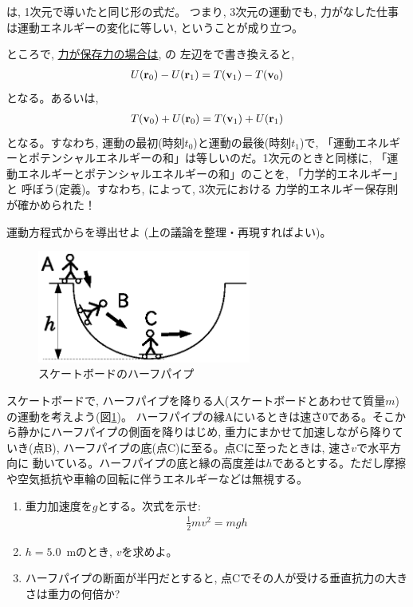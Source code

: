 は, 1次元で導いたと同じ形の式だ。
つまり, 3次元の運動でも, 力がなした仕事は運動エネルギーの変化に等しい, 
ということが成り立つ。

ところで, \underline{力が保存力の場合は}, の
左辺をで書き換えると, 
\begin{eqnarray}
U({\bf r}_0)-U({\bf r}_1)=T({\bf v}_1)-T({\bf v}_0)\label{3D_work_conservative0}
\end{eqnarray}
となる。あるいは, 
\begin{eqnarray}
T({\bf v}_0)+U({\bf r}_0)=T({\bf v}_1)+U({\bf r}_1)\label{3D_work_conservative1}
\end{eqnarray}
となる。すなわち, 運動の最初(時刻$t_0$)と運動の最後(時刻$t_1$)で, 
「運動エネルギーとポテンシャルエネルギーの和」は等しいのだ。1次元のときと同様に, 
「運動エネルギーとポテンシャルエネルギーの和」のことを, 「力学的エネルギー」と
呼ぼう(定義)。すなわち, によって, 3次元における
力学的エネルギー保存則が確かめられた！\\

\begin{q}\label{q:consmom3D} 運動方程式からを導出せよ
(上の議論を整理・再現すればよい)。\end{q}


\begin{figure}[h]
    \centering
    \includegraphics[width=7cm]{half_pipe.eps}
    \caption{スケートボードのハーフパイプ}\label{fig:half_pipe}
\end{figure}
\begin{q}\label{q:half_pipe}
スケートボードで, ハーフパイプを降りる人(スケートボードとあわせて質量$m$)の運動を考えよう(図\ref{fig:half_pipe})。
ハーフパイプの縁Aにいるときは速さ0である。そこから静かにハーフパイプの側面を降りはじめ, 
重力にまかせて加速しながら降りていき(点B), ハーフパイプの底(点C)に至る。点Cに至ったときは, 速さ$v$で水平方向に
動いている。ハーフパイプの底と縁の高度差は$h$であるとする。ただし摩擦や空気抵抗や車輪の回転に伴うエネルギーなどは無視する。
\begin{enumerate}
\item 重力加速度を$g$とする。次式を示せ:
\begin{eqnarray}\frac{1}{2}mv^2=mgh\end{eqnarray}
\item $h=5.0$~mのとき, $v$を求めよ。
\item ハーフパイプの断面が半円だとすると, 点Cでその人が受ける垂直抗力の大きさは重力の何倍か?
\end{enumerate}\end{q}

